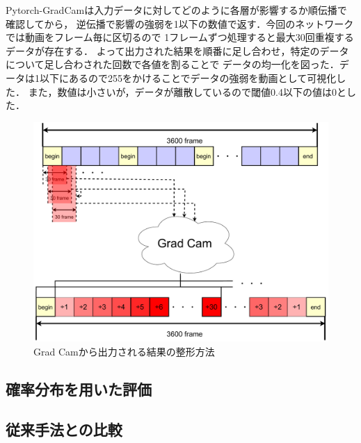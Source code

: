 Pytorch-GradCamは入力データに対してどのように各層が影響するか順伝播で確認してから，
逆伝播で影響の強弱を1以下の数値で返す．今回のネットワークでは動画をフレーム毎に区切るので
1フレームずつ処理すると最大30回重複するデータが存在する．
よって出力された結果を順番に足し合わせ，特定のデータについて足し合わされた回数で各値を割ることで
データの均一化を図った．データは1以下にあるので255をかけることでデータの強弱を動画として可視化した．
また，数値は小さいが，データが離散しているので閾値0.4以下の値は0とした．

\begin{figure}[b]
  \begin{center}
    \includegraphics[width=120mm]{images/chart/gradcam.pdf}
  \end{center}
  \caption{Grad Camから出力される結果の整形方法}
  \label{gradcam}
\end{figure}
\clearpage

\subsection{確率分布を用いた評価}

\subsection{従来手法との比較}